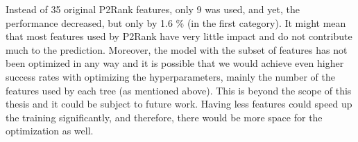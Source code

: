 \begin{table}[] \centering
{}
\caption[Comparison of the models with all P2Rank features and a subset of P2Rank features]{Comparison of the models with all P2Rank features and a subset of P2Rank features, plus \texttt{pdbekb\_conservation} csv feature. The model highlighted in gray was mentioned before and is stated here again for comparison.\newline
The subset of P2Rank features is following: 
\texttt{protrusion, bfactor, hydrophatyIndex, aromatic, hBondDonor, hBondAcceptor, hBondDonorAcceptor, hydrophobic, hydrophilic}.
}
\label{tab:subset}
\end{table}

Instead of 35 original P2Rank features, only 9 was used, and yet, the performance decreased, but only by 1.6 \% (in the first category). It might mean that most features used by P2Rank have very little impact and do not contribute much to the prediction. Moreover, the model with the subset of features has not been optimized in any way and it is possible that we would achieve even higher success rates with optimizing the hyperparameters, mainly the number of the features used by each tree (as mentioned above). This is beyond the scope of this thesis and it could be subject to future work. Having less features could speed up the training significantly, and therefore, there would be more space for the optimization as well.

